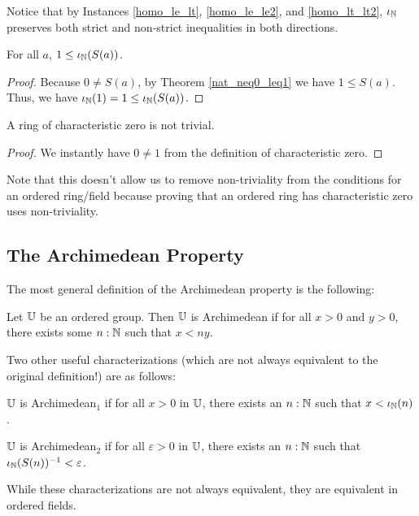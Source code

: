 \documentclass[../../math.tex]{subfiles}
\begin{document}
Notice that by Instances \ref{homo_le_lt}, \ref{homo_le_le2}, and
\ref{homo_lt_lt2}, $\iota_{\mathbb{N}}$ preserves both strict and non-strict inequalities in
both directions.

\begin{theorem} \label{from_nat_pos1}
    For all $a$, $1 \leq \iota_{\mathbb{N}}(S(a))$.
\end{theorem}
\begin{proof}
    Because $0 \neq S(a)$, by Theorem \ref{nat_neq0_leq1} we have $1 \leq S(a)$.
    Thus, we have $\iota_{\mathbb{N}}(1) = 1 \leq \iota_{\mathbb{N}}(S(a))$.
\end{proof}

\begin{instance}
    A ring of characteristic zero is not trivial.
\end{instance}
\begin{proof}
    We instantly have $0 \neq 1$ from the definition of characteristic zero.
\end{proof}
\noindent Note that this doesn't allow us to remove non-triviality from the
conditions for an ordered ring/field because proving that an ordered ring has
characteristic zero uses non-triviality.

\subsection{The Archimedean Property}

The most general definition of the Archimedean property is the following:

\begin{class}
    Let $\mathbb{U}$ be an ordered group.  Then $\mathbb{U}$ is Archimedean if for all $x > 0$
    and $y > 0$, there exists some $n : \mathbb{N}$ such that $x < ny$.
\end{class}

Two other useful characterizations (which are not always equivalent to the
original definition!) are as follows:

\begin{definition}
    $\mathbb{U}$ is Archimedean$_1$ if for all $x > 0$ in $\mathbb{U}$, there exists an $n : \mathbb{N}$
    such that $x < \iota_{\mathbb{N}}(n)$.
\end{definition}

\begin{definition}
    $\mathbb{U}$ is Archimedean$_2$ if for all $\varepsilon > 0$ in $\mathbb{U}$, there exists
    an $n : \mathbb{N}$ such that $\iota_{\mathbb{N}}(S(n))^{-1} < \varepsilon$.
\end{definition}

While these characterizations are not always equivalent, they are equivalent in
ordered fields.
\end{document}

